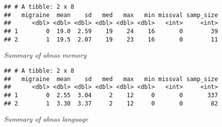 \documentclass[]{article}
\newenvironment{Shaded}{\begin{snugshade}}{\end{snugshade}}
\newcommand{\KeywordTok}[1]{\textcolor[rgb]{0.13,0.29,0.53}{\textbf{#1}}}
\newcommand{\DataTypeTok}[1]{\textcolor[rgb]{0.13,0.29,0.53}{#1}}
\newcommand{\StringTok}[1]{\textcolor[rgb]{0.31,0.60,0.02}{#1}}
\newcommand{\OtherTok}[1]{\textcolor[rgb]{0.56,0.35,0.01}{#1}}
\newcommand{\OperatorTok}[1]{\textcolor[rgb]{0.81,0.36,0.00}{\textbf{#1}}}
\newcommand{\NormalTok}[1]{#1}
\begin{document}
\begin{verbatim}
## # A tibble: 2 x 8
##   migraine  mean    sd   med   max   min missval samp_size
##      <dbl> <dbl> <dbl> <dbl> <dbl> <dbl>   <int>     <int>
## 1        0  19.0  2.59    19    24    16       0        39
## 2        1  19.5  2.07    19    23    16       0        11
\end{verbatim}

\emph{Summary of abnas memory}

\begin{Shaded}
\end{Shaded}

\begin{verbatim}
## # A tibble: 2 x 8
##   migraine  mean    sd   med   max   min missval samp_size
##      <dbl> <dbl> <dbl> <dbl> <dbl> <dbl>   <int>     <int>
## 1        0  2.55  3.04     2    12     0       0       337
## 2        1  3.30  3.37     2    12     0       0        82
\end{verbatim}

\emph{Summary of abnas language}
\end{document}
